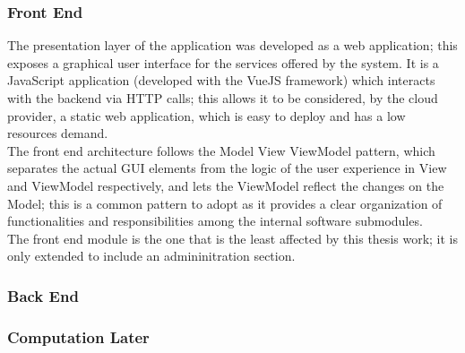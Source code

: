   \subsubsection{Front End}
  \label{ssse:originalfrontend}
    The presentation layer of the application was developed as a web application; this exposes a graphical user interface for the services offered by the system. It is a JavaScript application (developed with the VueJS framework) which interacts with the backend via HTTP calls; this allows it to be considered, by the cloud provider, a static web application, which is easy to deploy and has a low resources demand.\\
    The front end architecture follows the Model View ViewModel pattern, which separates the actual GUI elements from the logic of the user experience in View and ViewModel respectively, and lets the ViewModel reflect the changes on the Model; this is a common pattern to adopt as it provides a clear organization of functionalities and responsibilities among the internal software submodules.\\
    The front end module is the one that is the least affected by this thesis work; it is only extended to include an admininitration section.

  \subsubsection{Back End}
  \label{ssse:originalbackend}

  \subsubsection{Computation Later}
  \label{ssse:originalcomputationlayer}
